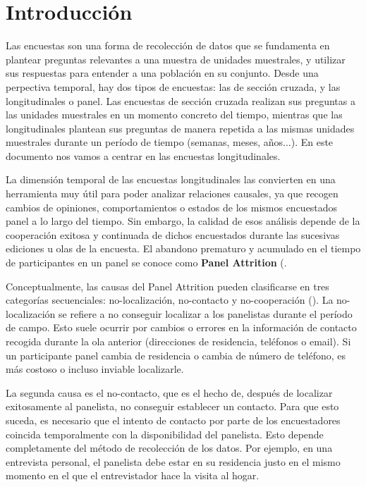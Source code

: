 \chapter{Introducción}
\label{chapter:introduccion}

Las encuestas son una forma de recolección de datos que se fundamenta en plantear preguntas relevantes a una muestra de unidades muestrales, y utilizar sus respuestas para entender a una población en su conjunto. Desde una perpectiva temporal, hay dos tipos de encuestas: las de sección cruzada, y las longitudinales o panel. Las encuestas de sección cruzada realizan sus preguntas a las unidades muestrales en un momento concreto del tiempo, mientras que las longitudinales plantean sus preguntas de manera repetida a las mismas unidades muestrales durante un período de tiempo (semanas, meses, años...). En este documento nos vamos a centrar en las encuestas longitudinales.

La dimensión temporal de las encuestas longitudinales las convierten en una herramienta muy útil para poder analizar relaciones causales, ya que recogen cambios de opiniones, comportamientos o estados de los mismos encuestados panel a lo largo del tiempo. Sin embargo, la calidad de esos análisis depende de la cooperación exitosa y continuada de dichos encuestados durante las sucesivas ediciones u olas de la encuesta. El abandono prematuro y acumulado en el tiempo de participantes en un panel se conoce como \textbf{Panel Attrition} (\cite{watson2009identifying}.

Conceptualmente, las causas del Panel Attrition pueden clasificarse en tres categorías secuenciales: no-localización, no-contacto y no-cooperación (\cite{lepkowski2002nonresponse}). La no-localización se refiere a no conseguir localizar a los panelistas durante el período de campo. Esto suele ocurrir por cambios o errores en la información de contacto recogida durante la ola anterior (direcciones de residencia, teléfonos o email). Si un participante panel cambia de residencia o cambia de número de teléfono, es más costoso o incluso inviable localizarle.

La segunda causa es el no-contacto, que es el hecho de, después de localizar exitosamente al panelista, no conseguir establecer un contacto. Para que esto suceda, es necesario que el intento de contacto por parte de los encuestadores coincida temporalmente con la disponibilidad del panelista. Esto depende completamente del método de recolección de los datos. Por ejemplo, en una entrevista personal, el panelista debe estar en su residencia justo en el mismo momento en el que el entrevistador hace la visita al hogar.

